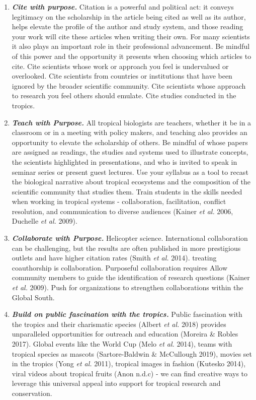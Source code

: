 \documentclass[
  12pt,
  man, donotrepeattitle]{apa6}
\begin{document}
\begin{enumerate}
\def\labelenumi{\arabic{enumi}.}
\item
  \textbf{\emph{Cite with purpose.}} Citation is a powerful and political act: it conveys legitimacy on the scholarship in the article being cited as well as its author, helps elevate the profile of the author and study system, and those reading your work will cite these articles when writing their own. For many scientists it also plays an important role in their professional advancement. Be mindful of this power and the opportunity it presents when choosing which articles to cite. Cite scientists whose work or approach you feel is undervalued or overlooked. Cite scientists from countries or institutions that have been ignored by the broader scientific community. Cite scientists whose approach to research you feel others should emulate. Cite studies conducted in the tropics.
\item
  \textbf{\emph{Teach with Purpose.}} All tropical biologists are teachers, whether it be in a classroom or in a meeting with policy makers, and teaching also provides an opportunity to elevate the scholarship of others. Be mindful of whose papers are assigned as readings, the studies and systems used to illustrate concepts, the scientists highlighted in presentations, and who is invited to speak in seminar series or present guest lectures. Use your syllabus as a tool to recast the biological narrative about tropical ecosystems and the composition of the scientific community that studies them. Train students in the skills needed when working in tropical systems - collaboration, facilitation, conflict resolution, and communication to diverse audiences (Kainer \emph{et al.} 2006, Duchelle \emph{et al.} 2009).
\item
  \textbf{\emph{Collaborate with Purpose.}} Helicopter science. International collaboration can be challenging, but the results are often published in more prestigious outlets and have higher citation rates (Smith \emph{et al.} 2014). treating coauthorship is collaboration. Purposeful collaboration requires Allow community members to guide the identification of research questions (Kainer \emph{et al.} 2009). Push for organizations to strengthen collaborations within the Global South.
\item
  \textbf{\emph{Build on public fascination with the tropics.}} Public fascination with the tropics and their charismatic species (Albert \emph{et al.} 2018) provides unparalleled opportunities for outreach and education (Moreira \& Robles 2017). Global events like the World Cup (Melo \emph{et al.} 2014), teams with tropical species as mascots (Sartore-Baldwin \& McCullough 2019), movies set in the tropics (Yong \emph{et al.} 2011), tropical images in fashion (Kutesko 2014), viral videos about tropical fruits (Anon n.d.c) - we can find creative ways to leverage this universal appeal into support for tropical research and conservation.

\end{enumerate}
\end{document}
